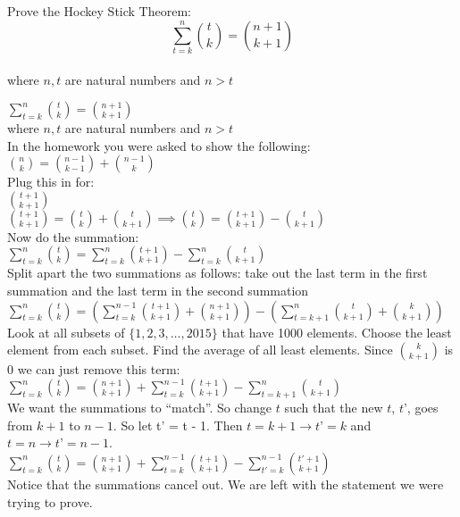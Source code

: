 \question Prove the Hockey Stick Theorem: \\
\[\sum\limits_{t = k}^n \binom{t}{k} = \binom{n + 1}{k + 1}\] \\
where $n, t$ are natural numbers and $n > t$ \\

\begin{solution}[8 cm]
$\sum\limits_{t = k}^n \binom{t}{k} = \binom{n + 1}{k + 1}$ \\
where $n, t$ are natural numbers and $n > t$ \\
In the homework you were asked to show the following: \\
$\binom{n}{k} = \binom{n - 1}{k - 1} + \binom{n - 1}{k}$ \\
Plug this in for: \\
$\binom{t + 1}{k + 1}$ \\
$\binom{t + 1}{k + 1} = \binom{t}{k} + \binom{t}{k + 1} \implies 
\binom{t}{k} = \binom{t + 1}{k + 1} - \binom{t}{k + 1}$ \\
Now do the summation: \\
$\sum\limits_{t = k}^n \binom{t}{k} = \sum\limits_{t = k}^n 
\binom{t + 1}{k + 1} - \sum\limits_{t = k}^n \binom{t}{k + 1}$ \\
Split apart the two summations as follows: take out the last term in the 
first summation and the last term in the second summation \\
$\sum\limits_{t = k}^n \binom{t}{k} = \left(\sum\limits_{t = k}^{n - 1} 
\binom{t + 1}{k + 1} + \binom{n + 1}{k + 1}\right) - 
\left(\sum\limits_{t = k + 1}^n \binom{t}{k + 1} + \binom{k}{k + 1}\right)$ \\
Look at all subsets of $\{1, 2, 3, \ldots, 2015\}$ that have 1000 elements. 
Choose the least element from each subset. Find the average of all least 
elements. Since $\binom{k}{k + 1}$ is 0 we can just remove this term: \\
$\sum\limits_{t = k}^n \binom{t}{k} = \binom{n + 1}{k + 1} + 
\sum\limits_{t = k}^{n - 1} \binom{t + 1}{k + 1} - \sum\limits_{t = k + 1}^n 
\binom{t}{k + 1}$ \\
We want the summations to “match”. So change $t$ such that the new $t$, 
$t’$, goes from $k + 1$ to $n - 1$. So let t’ = t - 1. Then 
$t = k + 1 \rightarrow t’ = k$ and $t = n \rightarrow t’ = n - 1$. \\
$\sum\limits_{t = k}^n \binom{t}{k} = \binom{n + 1}{k + 1} + 
\sum\limits_{t = k}^{n - 1} \binom{t + 1}{k + 1} - \sum\limits_{t' = k}^{n - 1} 
\binom{t' + 1}{k + 1}$ \\
Notice that the summations cancel out. We are left with the statement 
we were trying to prove.
\end{solution}
    